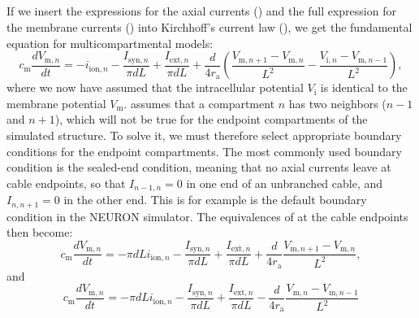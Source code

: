 \subsection{}
\label{sec:Neuron:Active_multicomp}
If we insert the expressions for the axial currents () and the full expression for the membrane currents () into Kirchhoff's current law (), we get the fundamental equation for multicompartmental models:
\begin{equation}
c_\text{m} \frac{dV_{\mathrm{m},n}}{dt} = -i_{\mathrm{ion},n} - \frac{I_{\mathrm{syn},n}}{\pi d L} +  \frac{I_{\mathrm{ext},n}}{\pi d L} + \frac{d}{4r_\text{a}}\left(\frac{V_{\mathrm{m},n+1}-V_{\mathrm{m},n}}{L^2} - \frac{V_{\mathrm{i},n}-V_{\mathrm{m},n-1}}{L^2} \right),
\label{eq:Neuron:multimain}
\end{equation}
where we now have assumed that the intracellular potential $V_{\mathrm{i}}$ is identical to the membrane potential  $V_{\mathrm{m}}$.  assumes that a compartment $n$ has two neighbors ($n-1$ and $n+1$), which will not be true for the endpoint compartments of the simulated structure. To solve it, we must therefore select appropriate boundary conditions for the endpoint compartments. The most commonly used boundary condition is the sealed-end condition, meaning that no axial currents leave at cable endpoints, so that $I_{n-1,n} = 0$ in one end of an unbranched cable, and $I_{n,n+1} =0$ in the other end. This is for example is the default boundary condition in the NEURON simulator. The equivalences of  at the cable endpoints then become:
\begin{equation}
c_\text{m} \frac{dV_{\mathrm{m},n}}{dt} = - \pi d L i_{\mathrm{ion},n} - \frac{I_{\mathrm{syn},n}}{\pi d L} +  \frac{I_{\mathrm{ext},n}}{\pi d L}  
+ \frac{d}{4 r_\text{a}} \frac{V_{\mathrm{m},n+1}-V_{\mathrm{m},n}}{L^2},
\label{eq:Neuron:multimainEND1}
\end{equation}
and
\begin{equation}
c_\text{m} \frac{dV_{\mathrm{m},n}}{dt} = - \pi d L i_{\mathrm{ion},n} - \frac{I_{\mathrm{syn},n}}{\pi d L} +  \frac{I_{\mathrm{ext},n}}{\pi d L}  
- \frac{d}{4 r_\text{a}} \frac{V_{\mathrm{m},n}-V_{\mathrm{m},n-1}}{L^2}  
\label{eq:Neuron:multimainEND2}
\end{equation}
 


